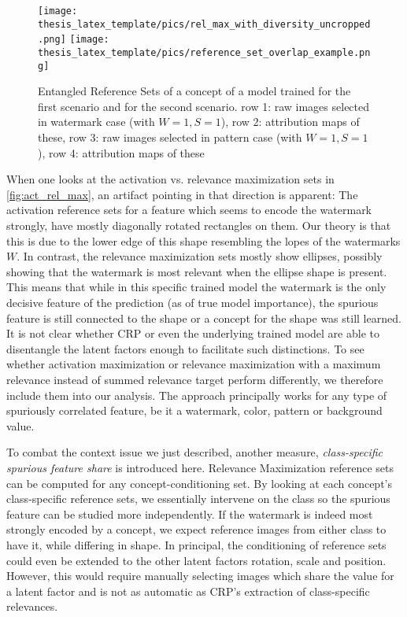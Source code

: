 \begin{figure}[t!]
    \centering
    \texttt{[image: thesis\_latex\_template/pics/rel\_max\_with\_diversity\_uncropped.png]}
    \texttt{[image: thesis\_latex\_template/pics/reference\_set\_overlap\_example.png]}
    \caption[Entangled Reference Sets]{Entangled Reference Sets of a concept of a model trained for the first scenario and for the second scenario.
    row 1: raw images selected in watermark case (with $W=1, S=1$), row 2: attribution maps of these, 
    row 3: raw images selected in pattern case (with $W=1, S=1$), row 4: attribution maps of these}
    \label{fig:entangled_ref_set}
\end{figure}

When one looks at the activation vs. relevance maximization sets in \cref{fig:act_rel_max}, an artifact pointing in that direction is apparent: 
The activation reference sets for a feature which seems to encode the watermark strongly, have mostly diagonally rotated rectangles on them. Our theory is that this is due to the lower edge of this shape resembling the lopes of the watermarks $W$. 
In contrast, the relevance maximization sets mostly show ellipses, possibly showing that the watermark is most relevant when the ellipse shape is present. 
This means that while in this specific trained model the watermark is the only decisive feature of the prediction (as of true model importance), the spurious feature is still connected to the shape or a concept for the shape was still learned. 
It is not clear whether CRP or even the underlying trained model are able to disentangle the latent factors enough to facilitate such distinctions.
To see whether activation maximization or relevance maximization with a maximum relevance instead of summed relevance target perform differently, we therefore include them into our analysis.
The approach principally works for any type of spuriously correlated feature, be it a watermark, color, pattern or background value. 

To combat the context issue we just described, another measure, \textit{class-specific spurious feature share} is introduced here. 
Relevance Maximization reference sets can be computed for any concept-conditioning set. 
By looking at each concept's class-specific reference sets, we essentially intervene on the class so the spurious feature can be studied more independently. If the watermark is indeed most strongly encoded by a concept, we expect reference images from either class to have it, while differing in shape.
In principal, the conditioning of reference sets could even be extended to the other latent factors rotation, scale and position. However, this would require manually selecting images which share the value for a latent factor and is not as automatic as CRP's extraction of class-specific relevances. 

